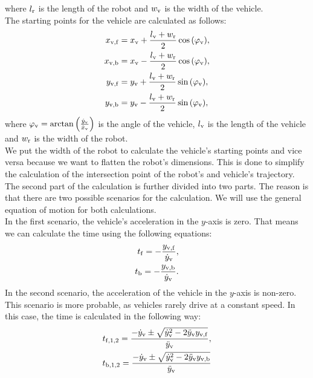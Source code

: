         where $l_{\rm{r}}$ is the length of the robot and $w_{\rm{v}}$ is the width of the vehicle.\\
        The starting points for the vehicle are calculated as follows:
        \begin{align}
            x_{\rm{v,f}} &= x_{\rm{v}} + \frac{l_{\rm{v}}+w_{\rm{r}}}{2}\cos{(\varphi_{\rm{v}})},\\
            x_{\rm{v,b}} &= x_{\rm{v}} - \frac{l_{\rm{v}}+w_{\rm{r}}}{2}\cos{(\varphi_{\rm{v}})},\\
            y_{\rm{v,f}} &= y_{\rm{v}} + \frac{l_{\rm{v}}+w_{\rm{r}}}{2}\sin{(\varphi_{\rm{v}})},\\
            y_{\rm{v,b}} &= y_{\rm{v}} - \frac{l_{\rm{v}}+w_{\rm{r}}}{2}\sin{(\varphi_{\rm{v}})},
        \end{align}
        where $\varphi_{\rm{v}} = \arctan{\left(\frac{\dot{y}_{\rm{v}}}{\dot{x}_{\rm{v}}}\right)}$ is the angle of the vehicle, $l_{\rm{v}}$ is the length of the vehicle and $w_{\rm{r}}$ is the width of the robot.\\
        We put the width of the robot to calculate the vehicle's starting points and vice versa because we want to flatten the robot's dimensions. This is done to simplify the calculation of the intersection point of the robot's and vehicle's trajectory.\\
        The second part of the calculation is further divided into two parts. The reason is that there are two possible scenarios for the calculation. We will use the general equation of motion \cite{equation_motion} for both calculations.\\
        In the first scenario, the vehicle's acceleration in the $y$-axis is zero. That means we can calculate the time using the following equations:
        \begin{align}
            t_{\rm{f}} = -\frac{y_{\rm{v,f}}}{\dot{y}_{\rm{v}}},\\
            t_{\rm{b}} = -\frac{y_{\rm{v,b}}}{\dot{y}_{\rm{v}}}.
        \end{align}
        In the second scenario, the acceleration of the vehicle in the $y$-axis is non-zero. This scenario is more probable, as vehicles rarely drive at a constant speed. In this case, the time is calculated in the following way:
        \begin{align}
            t_{\rm{f},1,2} = \frac{-\dot{y}_{\rm{v}}\pm\sqrt{\dot{y}_{\rm{v}}^2-2\ddot{y}_{\rm{v}}y_{\rm{v,f}}}}{\ddot{y}_{\rm{v}}},\\
            t_{\rm{b},1,2} = \frac{-\dot{y}_{\rm{v}}\pm\sqrt{\dot{y}_{\rm{v}}^2-2\ddot{y}_{\rm{v}}y_{\rm{v,b}}}}{\ddot{y}_{\rm{v}}}
        \end{align}
